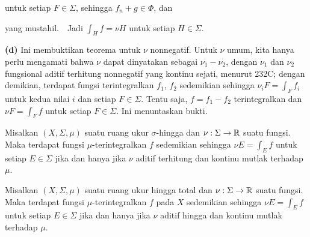 {

\noindent untuk setiap $F\in\Sigma$, sehingga $f_n+g\in\Phi$, dan


\noindent yang mustahil.\ \BanG\ Jadi $\int_Hf=\nu H$ untuk setiap
$H\in\Sigma$.

\medskip

{\bf (d)} Ini membuktikan teorema untuk $\nu$ nonnegatif. Untuk $\nu$
umum, kita hanya perlu mengamati bahwa $\nu$ dapat dinyatakan sebagai
$\nu_1-\nu_2$, dengan $\nu_1$ dan $\nu_2$ fungsional aditif terhitung
nonnegatif yang kontinu sejati, menurut 232C; dengan demikian,
terdapat fungsi terintegralkan $f_1$, $f_2$ sedemikian sehingga
$\nu_iF=\int_Ff_i$ untuk kedua nilai $i$ dan setiap $F\in\Sigma$.
Tentu saja, $f=f_1-f_2$ terintegralkan dan $\nu F=\int_Ff$ untuk setiap
$F\in\Sigma$. Ini menuntaskan bukti.
}%

 Misalkan $(X,\Sigma,\mu)$ suatu ruang ukur
$\sigma$-hingga dan $\nu:\Sigma\to\Bbb R$ suatu fungsi. Maka terdapat
fungsi $\mu$-terintegralkan $f$ sedemikian sehingga $\nu E=\int_Ef$
untuk setiap $E\in\Sigma$ jika dan hanya jika $\nu$ aditif terhitung
dan kontinu mutlak terhadap $\mu$.


 Misalkan $(X,\Sigma,\mu)$ suatu ruang ukur
hingga total dan $\nu:\Sigma\to\Bbb R$ suatu fungsi. Maka terdapat
fungsi $\mu$-terintegralkan $f$ pada $X$ sedemikian sehingga
$\nu E=\int_Ef$ untuk setiap $E\in\Sigma$ jika dan hanya jika $\nu$
aditif hingga dan kontinu mutlak terhadap $\mu$.


